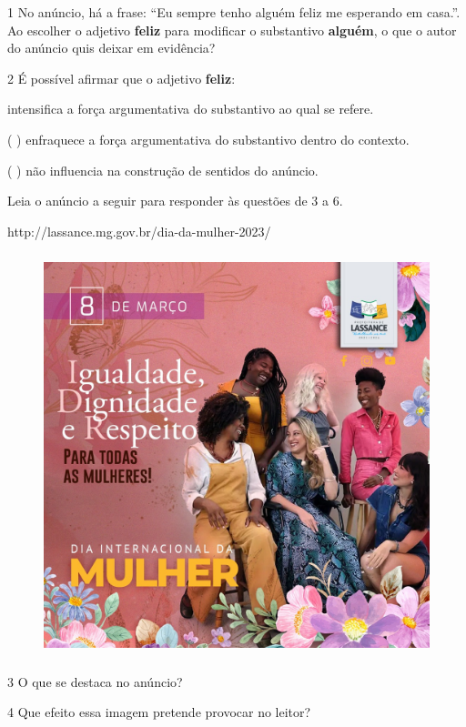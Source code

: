 \begin{itemize}
\begin{itemize}
{\begin{itemize}
\begin{itemize}
\num{1} No anúncio, há a frase: ``Eu sempre tenho alguém feliz me
esperando em casa.''. Ao escolher o adjetivo \textbf{feliz} para
modificar o substantivo \textbf{alguém}, o que o autor do anúncio quis
deixar em evidência? 

\num{2} É possível afirmar que o adjetivo \textbf{feliz}:

 intensifica a força argumentativa do substantivo ao qual se
refere.

( ) enfraquece a força argumentativa do substantivo dentro do contexto.

( ) não influencia na construção de sentidos do anúncio.

Leia o anúncio a seguir para responder às questões de 3 a 6.

http://lassance.mg.gov.br/dia-da-mulher-2023/

\begin{figure}
\centering
\includegraphics[width=4.61389in,height=4.61389in]{./_SAEB_9_POR/media/image20.jpeg}
\caption{}
\end{figure}

\num{3} O que se destaca no anúncio? 

\num{4} Que efeito essa imagem pretende provocar no leitor? 


\end{itemize}
\end{itemize}}
\end{itemize}
\end{itemize}

